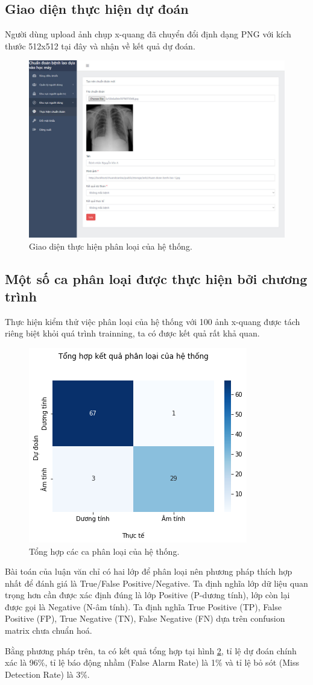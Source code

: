 \subsection{Giao diện thực hiện dự đoán}
Người dùng upload ảnh chụp x-quang đã chuyển đổi định dạng PNG với kích thước 512x512 tại đây và nhận về kết quả dự đoán.
\begin{figure}[H]
	\centering
	\includegraphics[width=0.95\linewidth]{images/user_du_doan_chi_tiet}
	\caption{Giao diện thực hiện phân loại của hệ thống.}
	\label{fig:user_danh_sach}
\end{figure}

\subsection{Một số ca phân loại được thực hiện bởi chương trình}
Thực hiện kiểm thử việc phân loại của hệ thống với 100 ảnh x-quang được tách riêng biệt khỏi quá trình trainning, ta có được kết quả rất khả quan.
\begin{figure}[H]
	\centering
	\includegraphics[width=0.66\linewidth]{images/result_backtest}
	\caption{Tổng hợp các ca phân loại của hệ thống.}
	\label{fig:result_backtest}
\end{figure}
Bài toán của luận văn chỉ có hai lớp để phân loại nên phương pháp thích hợp nhất để đánh giá là True/False Positive/Negative. Ta định nghĩa lớp dữ liệu quan trọng hơn cần được xác định đúng là lớp Positive (P-dương tính), lớp còn lại được gọi là Negative (N-âm tính). Ta định nghĩa True Positive (TP), False Positive (FP), True Negative (TN), False Negative (FN) dựa trên confusion matrix chưa chuẩn hoá. 

Bằng phương pháp trên, ta có kết quả tổng hợp tại hình \ref{fig:result_backtest}, tỉ lệ dự đoán chính xác là 96\%, tỉ lệ báo động nhầm (False Alarm Rate) là 1\% và tỉ lệ bỏ sót (Miss Detection Rate) là 3\%.  
